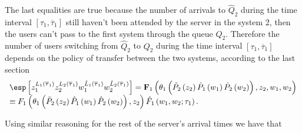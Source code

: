 The last equalities  are true because the number of arrivals to $\hat{Q}_{2}$ 
during the time interval $\left[\tau_{1},\overline{\tau}_{1}\right]$ still haven't been attended by the server in the system 2, then the users can't pass to the first system through the queue $Q_{2}$. Therefore the number of users switching from $\hat{Q}_{2}$ to $Q_{2}$ during the time interval $\left[\tau_{1},\overline{\tau}_{1}\right]$ depends on the policy of transfer between the two systems, according to the last section
\begin{eqnarray*}\label{Eq.Fs}
\begin{array}{l}
\esp\left[z_{1}^{L_{1}\left(\overline{\tau}_{1}\right)}z_{2}^{L_{2}\left(\overline{\tau}_{1}
\right)}w_{1}^{\hat{L}_{1}\left(\overline{\tau}_{1}\right)}w_{2}^{\hat{L}_{2}\left(
\overline{\tau}_{1}\right)}\right]
=\mathbf{F}_{1}\left(\theta_{1}\left(\tilde{P}_{2}\left(z_{2}\right)
\hat{P}_{1}\left(w_{1}\right)\hat{P}_{2}\left(w_{2}\right)\right),z_{2},w_{1},w_{2}\right)\\
\equiv F_{1}\left(\theta_{1}\left(\tilde{P}_{2}\left(z_{2}\right)\hat{P}_{1}\left(w_{1}\right)\hat{P}_{2}\left(w_{2}\right)\right),z_{2}\right)\hat{F}_{1}\left(w_{1},w_{2};\tau_{1}\right).
\end{array}
\end{eqnarray*}%

Using similar reasoning for the rest of the server's arrival times we have that

